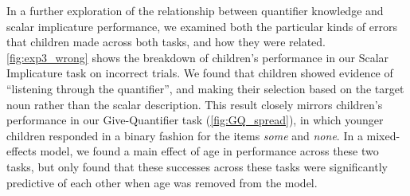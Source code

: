 \documentclass[man]{apa2}
\begin{document}
In a further exploration of the relationship between quantifier knowledge and scalar implicature performance, we examined both the particular kinds of errors that children made across both tasks, and how they were related. \ref{fig:exp3_wrong} shows the breakdown of children's performance in our Scalar Implicature task on incorrect trials. We found that children showed evidence of ``listening through the quantifier'', and making their selection based on the target noun rather than the scalar description. This result closely mirrors children's performance in our Give-Quantifier task (\ref{fig:GQ_spread}), in which younger children responded in a binary fashion for the items \textit{some} and \textit{none}. In a mixed-effects model, we found a main effect of age in performance across these two tasks, but only found that these successes across these tasks were significantly predictive of each other when age was removed from the model.
\end{document}
